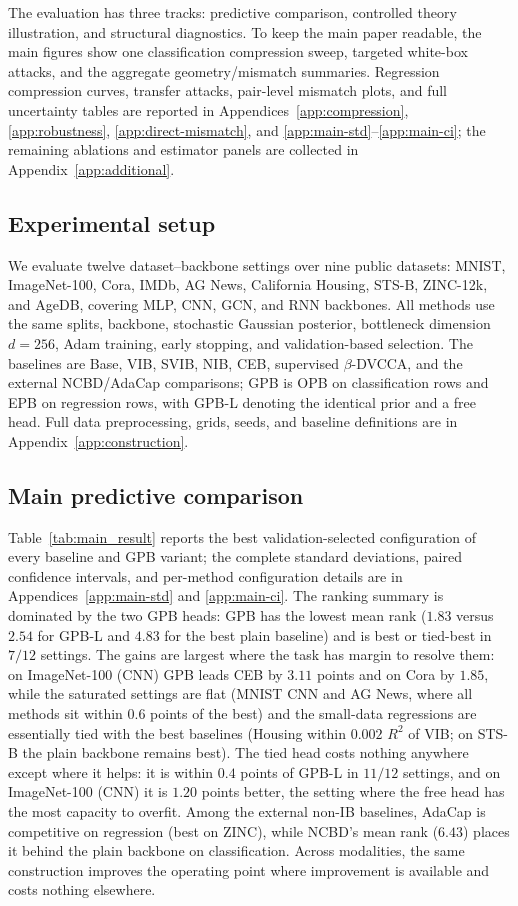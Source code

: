 The evaluation has three tracks: predictive comparison, controlled theory
illustration, and structural diagnostics. To keep the main paper readable, the main
figures show one classification compression sweep, targeted white-box attacks, and
the aggregate geometry/mismatch summaries. Regression compression curves, transfer
attacks, pair-level mismatch plots, and full uncertainty tables are reported in
Appendices~\ref{app:compression}, \ref{app:robustness},
\ref{app:direct-mismatch}, and \ref{app:main-std}--\ref{app:main-ci}; the remaining
ablations and estimator panels are collected in Appendix~\ref{app:additional}.

\subsection{Experimental setup}
\label{sec:setup}
We evaluate twelve dataset--backbone settings over nine public datasets: MNIST,
ImageNet-100, Cora, IMDb, AG News, California Housing, STS-B, ZINC-12k, and AgeDB,
covering MLP, CNN, GCN, and RNN backbones. All methods use the same splits, backbone,
stochastic Gaussian posterior, bottleneck dimension $d=256$, Adam training, early
stopping, and validation-based selection. The baselines are Base, VIB, SVIB, NIB,
CEB, supervised $\beta$-DVCCA, and the external NCBD/AdaCap comparisons; GPB is OPB
on classification rows and EPB on regression rows, with GPB-L denoting the identical
prior and a free head. Full data preprocessing, grids, seeds, and baseline definitions
are in Appendix~\ref{app:construction}.

\subsection{Main predictive comparison}
\label{sec:main-results}

Table~\ref{tab:main_result} reports the best validation-selected configuration of
every baseline and GPB variant; the complete standard deviations, paired confidence
intervals, and per-method configuration details are in Appendices~\ref{app:main-std}
and \ref{app:main-ci}. The ranking summary is dominated by the two GPB heads: GPB has
the lowest mean rank ($1.83$ versus $2.54$ for GPB-L and $4.83$ for the best plain
baseline) and is best or tied-best in $7/12$ settings. The gains are largest where the task has margin to
resolve them: on ImageNet-100 (CNN) GPB leads CEB by $3.11$ points and on Cora by
$1.85$, while the saturated settings are flat (MNIST CNN and AG News, where all
methods sit within $0.6$ points of the best) and the small-data regressions are
essentially tied with the best baselines (Housing within $0.002$ $R^2$ of VIB; on
STS-B the plain backbone remains best). The tied head costs nothing anywhere except
where it helps: it is within $0.4$ points of GPB-L in $11/12$ settings, and on
ImageNet-100 (CNN) it is $1.20$ points better, the setting where the free head has
the most capacity to overfit. Among the external non-IB baselines, AdaCap is
competitive on regression (best on ZINC), while NCBD's mean rank ($6.43$) places it
behind the plain backbone on classification. Across modalities, the same construction
improves the operating point where improvement is available and costs nothing
elsewhere.

